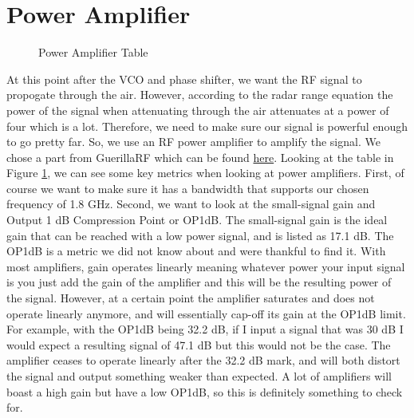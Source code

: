 \section{Power Amplifier}
\begin{figure}[H]
  \centering
  \caption{Power Amplifier Table}
  \label{img:poweramptable}
\end{figure}
At this point after the VCO and phase shifter, we want the RF signal to propogate through the air. However, according to the
radar range equation the power of the signal when attenuating through the air attenuates at a power of four which is a lot.
Therefore, we need to make sure our signal is powerful enough to go pretty far. So, we use an RF power amplifier to amplify the
signal. We chose a part from GuerillaRF which can be found \href{https://www.mouser.com/ProductDetail/Guerrilla-RF/GRF5112?qs=ulEaXIWI0c%252Bti188Qa1Now%3D%3D}{here}.
Looking at the table in Figure \ref{img:poweramptable}, we can see some key metrics when looking at power amplifiers. First,
of course we want to make sure it has a bandwidth that supports our chosen frequency of 1.8 GHz. Second, we want to look at the
small-signal gain and Output 1 dB Compression Point or OP1dB. The small-signal gain is the ideal gain that can be reached with a 
low power signal, and is listed as 17.1 dB. The OP1dB is a metric we did not know about and were thankful to find it. With most amplifiers,
gain operates linearly meaning whatever power your input signal is you just add the gain of the amplifier and this will be the resulting power of the signal.
However, at a certain point the amplifier saturates and does not operate linearly anymore, and will essentially cap-off its gain at
the OP1dB limit. For example, with the OP1dB being 32.2 dB, if I input a signal that was 30 dB I would expect a resulting signal of
47.1 dB but this would not be the case. The amplifier ceases to operate linearly after the 32.2 dB mark, and will both distort the signal
and output something weaker than expected. A lot of amplifiers will boast a high gain but have a low OP1dB, so this is definitely something to check for.

